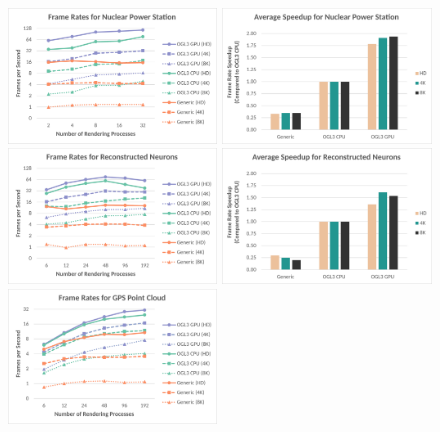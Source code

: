 \documentclass{vgtc}                          %
\begin{document}
\begin{figure}[!b]
  \centering %
  \includegraphics[width=0.494\textwidth,page=1]{FPS_NuclearPowerStation.pdf}
  \includegraphics[width=0.494\textwidth,page=1]{Speedup_NuclearPowerStation.pdf}\\
  \includegraphics[width=0.494\textwidth,page=1]{FPS_ReconstructedNeurons.pdf}
  \includegraphics[width=0.494\textwidth,page=1]{Speedup_ReconstructedNeurons.pdf}\\
  \includegraphics[width=0.494\textwidth,page=1]{FPS_GPSPointCloud.pdf}

\end{figure}
\end{document}
